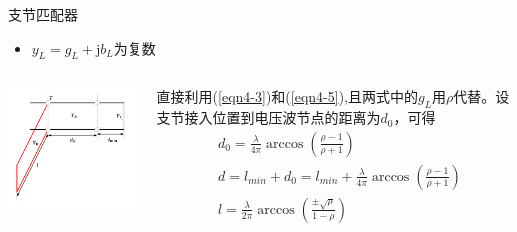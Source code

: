\begin{frame}{支节匹配器}
  \begin{itemize}
    \item $y_L=g_L+\mathrm{j}b_L$为复数
  \end{itemize}
  \begin{columns}
    \begin{column}{0.5\linewidth}
      \includegraphics[width=6cm]{Cha4//fig4-28true.pdf}
    \end{column}
    \begin{column}{0.5\linewidth}
      直接利用(\ref{eqn4-3})和(\ref{eqn4-5}),且两式中的$g_L$用$\rho$代替。设支节接入位置到电压波节点的距离为$d_0$，可得
      \begin{align*}
        &d_0=\frac{\lambda}{4\pi}\arccos\left(\frac{\rho-1}{\rho+1}\right)\\
        &d=l_{min}+d_0=l_{min}+\frac{\lambda}{4\pi}\arccos\left(\frac{\rho-1}{\rho+1}\right)\\
        &l=\frac{\lambda}{2\pi}\arccos\left(\frac{\pm\sqrt{\rho}}{1-\rho}\right)
      \end{align*}
    \end{column}
  \end{columns}
\end{frame}

